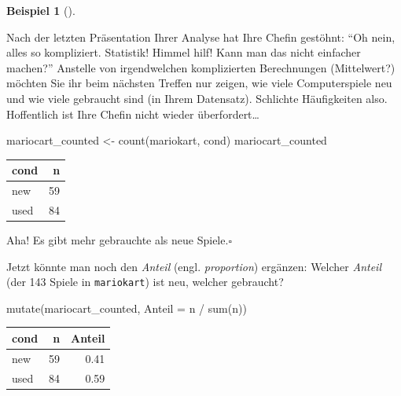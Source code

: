 \documentclass[
  letterpaper,
]{scrbook}
\newenvironment{Shaded}{\begin{snugshade}}{\end{snugshade}}
\newcommand{\AttributeTok}[1]{\textcolor[rgb]{0.40,0.45,0.13}{#1}}
\newcommand{\FunctionTok}[1]{\textcolor[rgb]{0.28,0.35,0.67}{#1}}
\newcommand{\NormalTok}[1]{\textcolor[rgb]{0.00,0.23,0.31}{#1}}
\newcommand{\OtherTok}[1]{\textcolor[rgb]{0.00,0.23,0.31}{#1}}
\newcommand{\SpecialCharTok}[1]{\textcolor[rgb]{0.37,0.37,0.37}{#1}}
\theoremstyle{definition}
\newtheorem{example}{Beispiel}[chapter]
\theoremstyle{definition}
\theoremstyle{definition}
\theoremstyle{remark}
\begin{document}
\begin{example}[]\protect\hypertarget{exm-count}{}\label{exm-count}

Nach der letzten Präsentation Ihrer Analyse hat Ihre Chefin gestöhnt:
``Oh nein, alles so kompliziert. Statistik! Himmel hilf! Kann man das
nicht einfacher machen?'' Anstelle von irgendwelchen komplizierten
Berechnungen (Mittelwert?) möchten Sie ihr beim nächsten Treffen nur
zeigen, wie viele Computerspiele neu und wie viele gebraucht sind (in
Ihrem Datensatz). Schlichte Häufigkeiten also. Hoffentlich ist Ihre
Chefin nicht wieder überfordert\ldots{}

\begin{Shaded}
\begin{Highlighting}[]
\NormalTok{mariocart\_counted }\OtherTok{\textless{}{-}} \FunctionTok{count}\NormalTok{(mariokart, cond)}
\NormalTok{mariocart\_counted}
\end{Highlighting}
\end{Shaded}

\begin{longtable}[]{@{}lr@{}}
\toprule\noalign{}
cond & n \\
\midrule\noalign{}
\endhead
\bottomrule\noalign{}
\endlastfoot
new & 59 \\
used & 84 \\
\end{longtable}

Aha! Es gibt mehr gebrauchte als neue Spiele.\(\square\)

\end{example}

Jetzt könnte man noch den \emph{Anteil} (engl. \emph{proportion})
ergänzen: Welcher \emph{Anteil} (der 143 Spiele in \texttt{mariokart})
ist neu, welcher gebraucht?

\begin{Shaded}
\begin{Highlighting}[]
\FunctionTok{mutate}\NormalTok{(mariocart\_counted, }\AttributeTok{Anteil =}\NormalTok{ n }\SpecialCharTok{/} \FunctionTok{sum}\NormalTok{(n))}
\end{Highlighting}
\end{Shaded}

\begin{longtable}[]{@{}lrr@{}}
\toprule\noalign{}
cond & n & Anteil \\
\midrule\noalign{}
\endhead
\bottomrule\noalign{}
\endlastfoot
new & 59 & 0.41 \\
used & 84 & 0.59 \\
\end{longtable}
\end{document}
